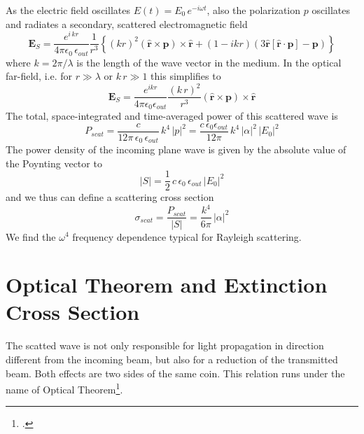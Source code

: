 As the electric field oscillates $E(t) = E_0 \, e^{-i \omega t}$, also the polarization $p$ oscillates and radiates a secondary, scattered electromagnetic field 
\[
  \mathbf{E}_S = \frac{ e^{i \, k  r} }{4\pi\epsilon_0 \, \epsilon_{out}}  \frac{1}{r^3}\left\{
      (k r )^2 \left( \hat{\mathbf{r}} \times \mathbf{p} \right) \times \hat{\mathbf{r}} +
      \left( 1 -  i k r \right)
        \left( 3\hat{\mathbf{r}} \left[\hat{\mathbf{r}} \cdot \mathbf{p}\right] - \mathbf{p} \right)
    \right\}
\]
where $k = 2 \pi / \lambda$ is the length of the wave vector in the medium. In the optical far-field, i.e. for $r \gg \lambda$ or $k \, r \gg 1$ this simplifies to 
\[
  \mathbf{E}_S = \frac{e^{ikr}}{4\pi\epsilon_0 \epsilon_{out} } 
      \frac{( k \, r)^2}{ r^3} \left( \hat{\mathbf{r}} \times \mathbf{p} \right) \times \hat{\mathbf{r}} 
\]
The total, space-integrated and time-averaged power of this scattered wave is
\[
P_{scat} =\frac{c  }{12 \pi  \, \epsilon_0 \, \epsilon_{out} } \, k^4 \, |p|^2 =
\frac{c \, \epsilon_0 \epsilon_{out} }{12 \pi  } \, k^4 \, |\alpha|^2 \, |E_0|^2
\]
The power density of the incoming plane wave is given by the absolute value of the Poynting vector to 
\[
 |S| = \frac{1}{2} \, c \, \epsilon_0 \, \epsilon_{out} \, |E_0|^2
\]
and we thus can define a scattering cross section
\[
\sigma_{scat} = \frac{P_{scat}}{|S|} = \frac{k^4}{6 \pi }  \, |\alpha|^2 
\]
We find the $\omega^4$ frequency dependence typical for Rayleigh scattering.



\section{Optical Theorem and Extinction Cross Section}

The scatted wave is not only responsible for light propagation in direction different from the incoming beam, but also for a reduction of the transmitted beam. Both effects are two sides of the same coin. This relation runs under the name of Optical Theorem\footcite{Newton:1976cz}.


